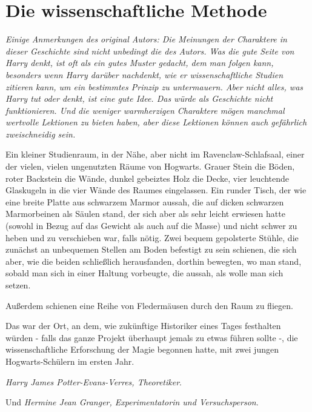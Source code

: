 \chapter{Die wissenschaftliche Methode}

\emph{Einige Anmerkungen des original Autors: Die Meinungen der Charaktere in
dieser Geschichte sind nicht unbedingt die des Autors. Was die gute Seite von
Harry denkt, ist oft als ein gutes Muster gedacht, dem man folgen kann,
besonders wenn Harry darüber nachdenkt, wie er wissenschaftliche Studien
zitieren kann, um ein bestimmtes Prinzip zu untermauern. Aber nicht alles, was
Harry tut oder denkt, ist eine gute Idee. Das würde als Geschichte nicht
funktionieren. Und die weniger warmherzigen Charaktere mögen manchmal wertvolle
Lektionen zu bieten haben, aber diese Lektionen können auch gefährlich
zweischneidig sein. }

Ein kleiner Studienraum, in der Nähe, aber nicht im Ravenclaw-Schlafsaal, einer
der vielen, vielen ungenutzten Räume von Hogwarts. Grauer Stein die Böden, roter
Backstein die Wände, dunkel gebeiztes Holz die Decke, vier leuchtende Glaskugeln
in die vier Wände des Raumes eingelassen. Ein runder Tisch, der wie eine breite
Platte aus schwarzem Marmor aussah, die auf dicken schwarzen Marmorbeinen als
Säulen stand, der sich aber als sehr leicht erwiesen hatte (sowohl in Bezug auf
das Gewicht als auch auf die Masse) und nicht schwer zu heben und zu verschieben
war, falls nötig. Zwei bequem gepolsterte Stühle, die zunächst an unbequemen
Stellen am Boden befestigt zu sein schienen, die sich aber, wie die beiden
schließlich herausfanden, dorthin bewegten, wo man stand, sobald man sich in
einer Haltung vorbeugte, die aussah, als wolle man sich setzen.

Außerdem schienen eine Reihe von Fledermäusen durch den Raum zu fliegen.

Das war der Ort, an dem, wie zukünftige Historiker eines Tages festhalten würden
- falls das ganze Projekt überhaupt jemals zu etwas führen sollte -, die
wissenschaftliche Erforschung der Magie begonnen hatte, mit zwei jungen
Hogwarts-Schülern im ersten Jahr.

\emph{Harry James Potter-Evans-Verres, Theoretiker}.

Und \emph{Hermine Jean Granger, Experimentatorin und Versuchsperson}.


